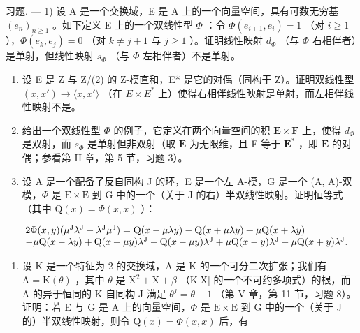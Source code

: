习题. --- 1) 设 A 是一个交换域，E 是 A 上的一个向量空间，具有可数无穷基 \((e_n)_{n \geqslant 1}\) 。如下定义 E 上的一个双线性型 \(\Phi\) ：令 \(\Phi(e_{i+1}, e_i) = 1\) （对 \(i \geqslant 1\) ），\(\Phi(e_k, e_j) = 0\) （对 \(k \neq j + 1\) 与 \(j \geqslant 1\) ）。证明线性映射 \(d_\Phi\) （与 \(\Phi\) 右相伴者）是单射，但线性映射 \(s_\Phi\) （与 \(\Phi\) 左相伴者）不是单射。

\begin{enumerate}
\def\labelenumi{\arabic{enumi})}
\setcounter{enumi}{1}
\item
  设 E 是 Z 与 Z/(2) 的 Z-模直和，E* 是它的对偶（同构于 Z）。证明双线性型 \((x, x') \to \langle x, x' \rangle\) （在 \(E \times E^*\) 上）使得右相伴线性映射是单射，而左相伴线性映射不是。
\item
  给出一个双线性型 \(\Phi\) 的例子，它定义在两个向量空间的积 \(\mathbf{E} \times \mathbf{F}\) 上，使得 \(d_{\Phi}\) 是双射，而 \(s_{\Phi}\) 是单射但非双射（取 \(\mathbf{E}\) 为无限维，且 F 等于 \(\mathbf{E}^*\) ，即 \(\mathbf{E}\) 的对偶；参看第 II 章，第 5 节，习题 3）。
\item
  设 A 是一个配备了反自同构 J 的环，E 是一个左 A-模，G 是一个 (A, A)-双模，\(\Phi\) 是 \(\mathrm{E} \times \mathrm{E}\) 到 G 中的一个（关于 J 的右）半双线性映射。证明恒等式（其中 \(\mathrm{Q}(x) = \Phi(x, x)\) ）：
\end{enumerate}

\[
\begin{array}{r l} & {2 \Phi (x, y) (\mu^ {\mathrm{J}} \lambda^ {\mathrm{J}} - \lambda^ {\mathrm{J}} \mu^ {\mathrm{J}}) = \mathrm{Q} (x - \mu \lambda y) - \mathrm{Q} (x + \mu \lambda y) + \mu \mathrm{Q} (x + \lambda y)} \\ & {- \mu \mathrm{Q} (x - \lambda y) + \mathrm{Q} (x + \mu y) \lambda^ {\mathrm{J}} - \mathrm{Q} (x - \mu y) \lambda^ {\mathrm{J}} + \mu \mathrm{Q} (x - y) \lambda^ {\mathrm{J}} - \mu \mathrm{Q} (x + y) \lambda^ {\mathrm{J}}.} \end{array}
\]

\begin{enumerate}
\def\labelenumi{\arabic{enumi})}
\setcounter{enumi}{4}
\tightlist
\item
  设 K 是一个特征为 2 的交换域，A 是 K 的一个可分二次扩张；我们有 \(\mathrm{A} = \mathrm{K}(\theta)\) ，其中 \(\theta\) 是 \(\mathrm{X}^2 +\mathrm{X} + \beta\) （K{[}X{]} 的一个不可约多项式）的根，而 A 的异于恒同的 K-自同构 J 满足 \(\theta^{j} = \theta +1\) （第 V 章，第 11 节，习题 8）。证明：若 E 与 G 是 A 上的向量空间，\(\Phi\) 是 \(\mathrm{E}\times \mathrm{E}\) 到 G 中的一个（关于 J 的）半双线性映射，则令 \(\mathrm{Q}(x) = \Phi (x,x)\) 后，有
\end{enumerate}

